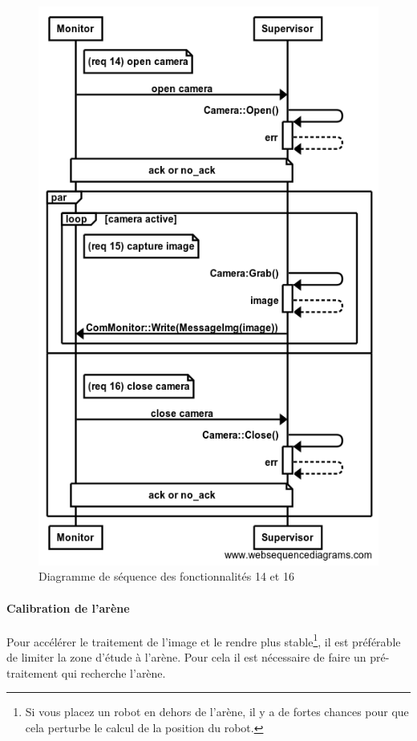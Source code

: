 \begin{figure}[htbp]
\begin{center}
\includegraphics[scale=0.4]{./seq_req/req14-16}
\caption{Diagramme de séquence des fonctionnalités 14 et 16}
\label{fig:diag14_15}
\end{center}
\end{figure}
\FloatBarrier

\paragraph{Calibration de l'arène} Pour accélérer le traitement de l'image et le rendre plus stable\footnote{Si vous placez un robot en dehors de l'arène, il y a de fortes chances pour que cela perturbe le calcul de la position du robot.}, il est préférable de limiter la zone d'étude à l'arène. Pour cela il est nécessaire de faire un pré-traitement qui recherche l'arène.
 
